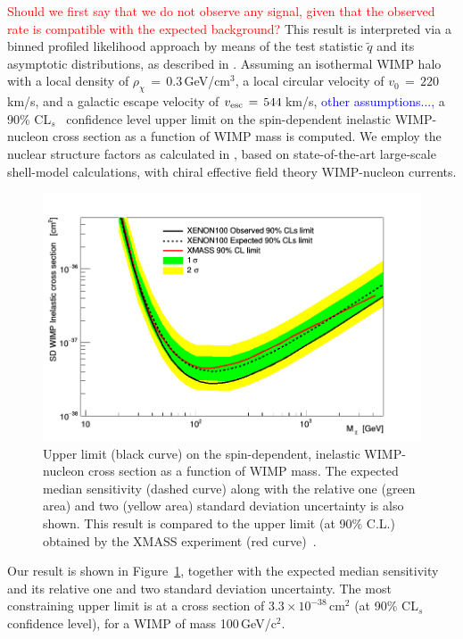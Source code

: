  
{\textcolor{red} {Should we first say that we do not observe any signal, given that the observed rate is compatible with the expected background?}}
This result is interpreted via a binned profiled likelihood approach by means of the test statistic $\tilde{q}$
and its asymptotic distributions, as  described in \cite{asympt}. 
Assuming  an isothermal WIMP halo with a local density of $\rho_{\chi} \, = \, 0.3$\,GeV/cm$^3$, a local circular velocity of $v_0 \,= \, 220$\,km/s, and a galactic escape velocity of $v_{\rm{esc}} \, = \, 544$\,km/s, 
\textcolor{blue}{other assumptions...,} a 90\% CL$_s$~\cite{cls} confidence level upper limit on the spin-dependent inelastic WIMP-nucleon cross section as a function of WIMP mass is computed. We employ the nuclear structure factors as calculated in \cite{Baudis:2013qla}, based on state-of-the-art large-scale shell-model calculations, with chiral effective field theory WIMP-nucleon currents. 

\begin{figure}[h]
  \includegraphics[width=\linewidth]{images/limit_reb.png}
  \caption{Upper limit (black curve) on the spin-dependent, inelastic WIMP-nucleon cross section as a function of WIMP mass.  The expected median sensitivity (dashed curve) along with the relative one (green area) and two (yellow area) standard deviation uncertainty is also shown. This result is compared to the upper limit (at 90\% C.L.) obtained by the XMASS experiment (red curve)~\cite{Uchida:2014cnn}.}
  \label{fig:limits}
\end{figure}


Our result is shown in Figure~\ref{fig:limits}, together with the expected median sensitivity and its relative one and two  standard deviation uncertainty.
The most constraining upper limit is  at a cross section of $3.3 \times 10^{-38}$\,cm$^{2}$ (at 90\% CL$_s$ confidence level), for a WIMP of mass 100\,GeV/c$^2$. 


